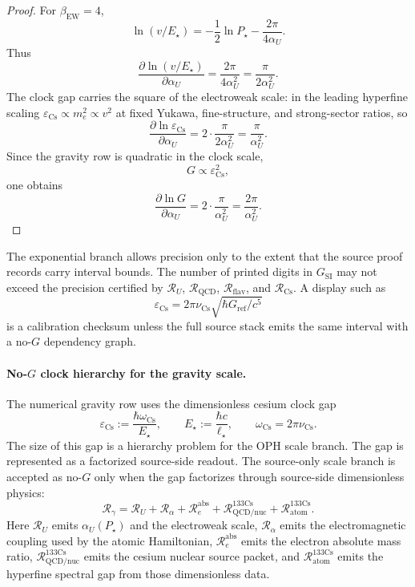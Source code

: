 \begin{proof}
For \(\beta_{\mathrm{EW}}=4\),
\[
\ln(v/E_\star)
=
-\frac12\ln P_\star
-
\frac{2\pi}{4\alpha_U}.
\]
Thus
\[
\frac{\partial\ln(v/E_\star)}{\partial\alpha_U}
=
\frac{2\pi}{4\alpha_U^2}
=
\frac{\pi}{2\alpha_U^2}.
\]
The clock gap carries the square of the electroweak scale: in the leading hyperfine scaling
\(\varepsilon_{\mathrm{Cs}}\propto m_e^2\propto v^2\) at fixed Yukawa, fine-structure, and
strong-sector ratios, so
\[
\frac{\partial\ln \varepsilon_{\mathrm{Cs}}}{\partial\alpha_U}
=
2\cdot\frac{\pi}{2\alpha_U^2}
=
\frac{\pi}{\alpha_U^2}.
\]
Since the gravity row is quadratic in the clock scale,
\[
G\propto \varepsilon_{\mathrm{Cs}}^2,
\]
one obtains
\[
\frac{\partial\ln G}{\partial\alpha_U}
=
2\cdot\frac{\pi}{\alpha_U^2}
=
\frac{2\pi}{\alpha_U^2}.
\]
\end{proof}

\begin{remark}\label{rem:gravity-digits-policy}
The exponential branch allows precision only to the extent that the source proof records carry
interval bounds. The number of printed digits in \(G_{\mathrm{SI}}\) may not exceed the precision
certified by \(\mathcal R_U\), \(\mathcal R_{\mathrm{QCD}}\), \(\mathcal R_{\mathrm{flav}}\), and
\(\mathcal R_{\mathrm{Cs}}\). A display such as
\[
\varepsilon_{\mathrm{Cs}}
=
2\pi\nu_{\mathrm{Cs}}\sqrt{\hbar G_{\mathrm{ref}}/c^5}
\]
is a calibration checksum unless the full source stack emits the same interval with a no-\(G\)
dependency graph.
\end{remark}

\paragraph{No-\(G\) clock hierarchy for the gravity scale.}
The numerical gravity row uses the dimensionless cesium clock gap
\[
\varepsilon_{\mathrm{Cs}}
:=
\frac{\hbar\omega_{\mathrm{Cs}}}{E_\star},
\qquad
E_\star:=\frac{\hbar c}{\ell_\star},
\qquad
\omega_{\mathrm{Cs}}=2\pi\nu_{\mathrm{Cs}}.
\]
The size of this gap is a hierarchy problem for the OPH scale branch. The gap is represented as a
factorized source-side readout. The source-only scale branch is accepted as no-\(G\) only when the
gap factorizes through source-side dimensionless physics:
\[
\mathcal R_\gamma
=
\mathcal R_U
+
\mathcal R_\alpha
+
\mathcal R_{e}^{\mathrm{abs}}
+
\mathcal R_{\mathrm{QCD/nuc}}^{133\mathrm{Cs}}
+
\mathcal R_{\mathrm{atom}}^{133\mathrm{Cs}}.
\]
Here \(\mathcal R_U\) emits \(\alpha_U(P_\star)\) and the electroweak scale,
\(\mathcal R_\alpha\) emits the electromagnetic coupling used by the atomic Hamiltonian,
\(\mathcal R_e^{\mathrm{abs}}\) emits the electron absolute mass ratio,
\(\mathcal R_{\mathrm{QCD/nuc}}^{133\mathrm{Cs}}\) emits the cesium nuclear source packet, and
\(\mathcal R_{\mathrm{atom}}^{133\mathrm{Cs}}\) emits the hyperfine spectral gap from those
dimensionless data.

